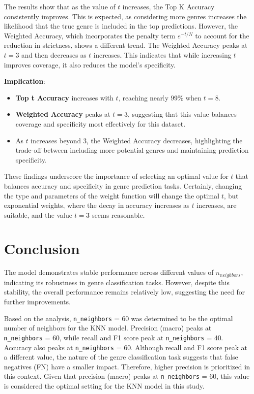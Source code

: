 \documentclass[times, twocolumn]{article}
\begin{document}
The results show that as the value of $t$ increases, the Top K Accuracy consistently improves. This is expected, as considering more genres increases the likelihood that the true genre is included in the top predictions. However, the Weighted Accuracy, which incorporates the penalty term $e^{-t/N}$ to account for the reduction in strictness, shows a different trend. The Weighted Accuracy peaks at $t = 3$ and then decreases as $t$ increases. This indicates that while increasing $t$ improves coverage, it also reduces the model's specificity.

\textbf{Implication}:
\begin{itemize}
    \item \textbf{Top t Accuracy} increases with $t$, reaching nearly 99\% when $t = 8$.
    \item \textbf{Weighted Accuracy} peaks at $t = 3$, suggesting that this value balances coverage and specificity most effectively for this dataset.
    \item As $t$ increases beyond 3, the Weighted Accuracy decreases, highlighting the trade-off between including more potential genres and maintaining prediction specificity.
\end{itemize}

These findings underscore the importance of selecting an optimal value for $t$ that balances accuracy and specificity in genre prediction tasks. Certainly, changing the type and parameters of the weight function will change the optimal $t$, but exponential weights, where the decay in accuracy increases as $t$ increases, are suitable, and the value $t=3$ seems reasonable.

\section{Conclusion}
The model demonstrates stable performance across different values of $n_{neighbors}$, indicating its robustness in genre classification tasks. However, despite this stability, the overall performance remains relatively low, suggesting the need for further improvements.

Based on the analysis, \verb|n_neighbors| = 60 was determined to be the optimal number of neighbors for the KNN model. Precision (macro) peaks at \verb|n_neighbors| = 60, while recall and F1 score peak at \verb|n_neighbors| = 40. Accuracy also peaks at \verb|n_neighbors| = 60. Although recall and F1 score peak at a different value, the nature of the genre classification task suggests that false negatives (FN) have a smaller impact. Therefore, higher precision is prioritized in this context. Given that precision (macro) peaks at \verb|n_neighbors| = 60, this value is considered the optimal setting for the KNN model in this study.
\end{document}
